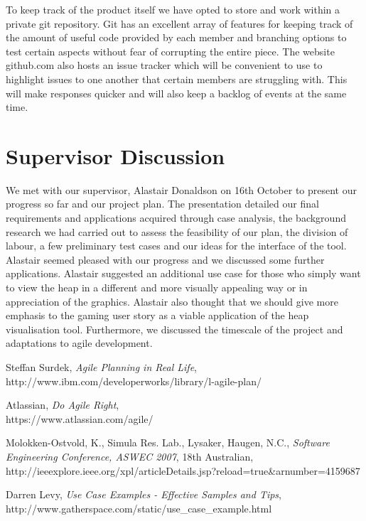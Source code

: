 \documentclass[10pt, a4paper]{article}
\begin{document}
To keep track of the product itself we have opted to store and work within a private git repository. Git has an excellent array of features for keeping track of the amount of useful code provided by each member and branching options to test certain aspects without fear of corrupting the entire piece. The website github.com also hosts an issue tracker which will be convenient to use to highlight issues to one another that certain members are struggling with. This will make responses quicker and will also keep a backlog of events at the same time.
 
\section{Supervisor Discussion}

We met with our supervisor, Alastair Donaldson on 16th October to present our progress so far and our project plan. The presentation detailed our final requirements and applications acquired through case analysis, the background research we had carried out to assess the feasibility of our plan, the division of labour, a few preliminary test cases and our ideas for the interface of the tool. Alastair seemed pleased with our progress and we discussed some further applications. Alastair suggested an additional use case for those who simply want to view the heap in a different and more visually appealing way or in appreciation of the graphics. Alastair also thought that we should give more emphasis to the gaming user story as a viable application of the heap visualisation tool. Furthermore, we discussed the timescale of the project and adaptations to agile development. 

\begin{thebibliography}{9}

  Steffan Surdek,
  \emph{Agile Planning in Real Life},
  \\http://www.ibm.com/developerworks/library/l-agile-plan/

  Atlassian,
  \emph{Do Agile Right},
  \\https://www.atlassian.com/agile/
  
  Molokken-Ostvold, K., Simula Res. Lab., Lysaker, Haugen, N.C.,
  \emph{Software Engineering Conference, ASWEC 2007},
  18th Australian,
  \\http://ieeexplore.ieee.org/xpl/articleDetails.jsp?reload=true{\&}arnumber=4159687
  
  Darren Levy,
  \emph{Use Case Examples - Effective Samples and Tips},
  \\http://www.gatherspace.com/static/use{\_}case{\_}example.html

\end{thebibliography}
\end{document}
